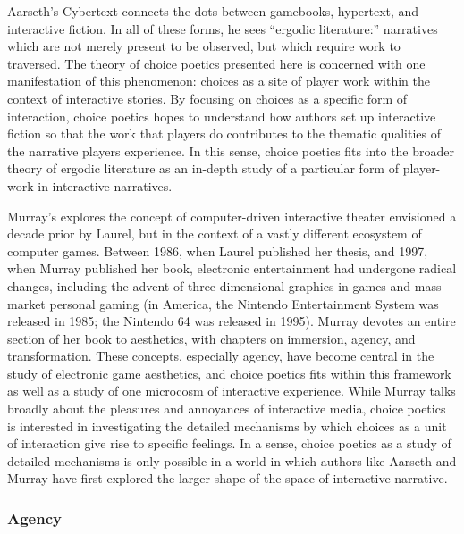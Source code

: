 Aarseth's Cybertext connects the dots between gamebooks, hypertext, and interactive fiction.
%
In all of these forms, he sees ``ergodic literature:'' narratives which are not merely present to be observed, but which require work to traversed.
%
The theory of choice poetics presented here is concerned with one manifestation of this phenomenon: choices as a site of player work within the context of interactive stories.
%
By focusing on choices as a specific form of interaction, choice poetics hopes to understand how authors set up interactive fiction so that the work that players do contributes to the thematic qualities of the narrative players experience.
%
In this sense, choice poetics fits into the broader theory of ergodic literature as an in-depth study of a particular form of player-work in interactive narratives.


Murray's  explores the concept of computer-driven interactive theater envisioned a decade prior by Laurel, but in the context of a vastly different ecosystem of computer games.
%
Between 1986, when Laurel published her thesis, and 1997, when Murray published her book, electronic entertainment had undergone radical changes, including the advent of three-dimensional graphics in games and mass-market personal gaming (in America, the Nintendo Entertainment System was released in 1985; the Nintendo 64 was released in 1995).
%
Murray devotes an entire section of her book to aesthetics, with chapters on immersion, agency, and transformation.
%
These concepts, especially agency, have become central in the study of electronic game aesthetics, and choice poetics fits within this framework as well as a study of one microcosm of interactive experience.
%
While Murray talks broadly about the pleasures and annoyances of interactive media, choice poetics is interested in investigating the detailed mechanisms by which choices as a unit of interaction give rise to specific feelings.
%
In a sense, choice poetics as a study of detailed mechanisms is only possible in a world in which authors like Aarseth and Murray have first explored the larger shape of the space of interactive narrative.


\subsubsection{Agency}

